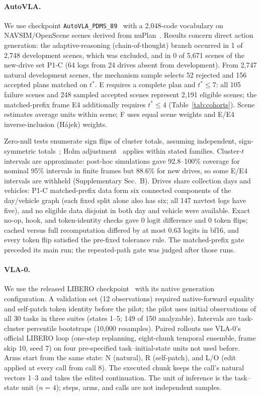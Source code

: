 \paragraph{AutoVLA.}
We use checkpoint \texttt{AutoVLA\_PDMS\_89}~\cite{zhou2025autovla} with a 2,048-code vocabulary on NAVSIM/OpenScene scenes derived from nuPlan~\cite{dauner2024navsim,openscene2023,caesar2021nuplan}. Results concern direct action generation: the adaptive-reasoning (chain-of-thought) branch occurred in 1 of 2,748 development scenes, which was excluded, and in 0 of 5,671 scenes of the new-drive set P1-C (64 logs from 24 drives absent from development). From 2,747 natural development scenes, the mechanism sample selects 52 rejected and 156 accepted plans matched on $t^*$. E requires a complete plan and $t^*\leq7$: all 105 failure scenes and 248 sampled accepted scenes represent 2,191 eligible scenes; the matched-prefix frame E4 additionally requires $t^*\leq4$ (Table~\ref{tab:cohorts}). Scene estimates average units within scene; F uses equal scene weights and E/E4 inverse-inclusion (H\'ajek) weights.

Zero-null tests enumerate sign flips of cluster totals, assuming independent, sign-symmetric totals~\cite{winkler2015multilevel}; Holm adjustment~\cite{holm1979simple} applies within stated families. Cluster-$t$ intervals are approximate: post-hoc simulations gave 92.8--100\% coverage for nominal 95\% intervals in finite frames but 88.6\% for new drives, so some E/E4 intervals are withheld (Supplementary Sec.~B). Drives share collection days and vehicles: P1-C matched-prefix data form six connected components of the day/vehicle graph (each fixed split alone also has six; all 147 navtest logs have five), and no eligible data disjoint in both day and vehicle were available. Exact no-op, hook, and token-identity checks gave 0 logit difference and 0 token flips; cached versus full recomputation differed by at most 0.63 logits in bf16, and every token flip satisfied the pre-fixed tolerance rule. The matched-prefix gate preceded its main run; the repeated-path gate was judged after those runs.

\paragraph{VLA-0.}
We use the released LIBERO checkpoint~\cite{goyal2025vla0,liu2023libero} with its native generation configuration. A validation set (12 observations) required native-forward equality and self-patch token identity before the pilot; the pilot uses initial observations of all 30 tasks in three suites (states 1--5; 149 of 150 analyzable). Intervals are task-cluster percentile bootstraps (10,000 resamples). Paired rollouts use VLA-0's official LIBERO loop (one-step replanning, eight-chunk temporal ensemble, frame skip 10, seed 7) on four pre-specified task--initial-state units not used before. Arms start from the same state: N (natural), R (self-patch), and L/O (edit applied at every call from call 8). The executed chunk keeps the call's natural vectors 1--3 and takes the edited continuation. The unit of inference is the task--state unit ($n=4$); steps, arms, and calls are not independent samples.

